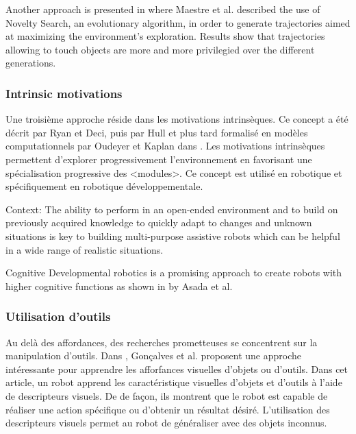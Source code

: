 \documentclass{llncs}
\begin{document}
Another approach is presented in \cite{Maestre2015} where Maestre et al. described the use of Novelty Search, an evolutionary algorithm, in order to generate trajectories aimed at maximizing the environment's exploration. Results show that trajectories allowing to touch objects are more and more privilegied over the different generations.

\subsubsection{Intrinsic motivations}
Une troisième approche réside dans les motivations intrinsèques. Ce concept a été décrit par Ryan et Deci, puis par Hull et plus tard formalisé en modèles computationnels par Oudeyer et Kaplan dans \cite{10.3389/neuro.12.006.2007}. Les motivations intrinsèques permettent d'explorer progressivement l'environnement en favorisant une spécialisation progressive des <modules>. Ce concept est utilisé en robotique et spécifiquement en robotique développementale.


Context: The ability to perform in an open-ended environment and to build on previously acquired knowledge to quickly adapt to changes and unknown situations is key to building
multi-purpose assistive robots which can be helpful in a wide range of realistic situations.

Cognitive Developmental robotics is a promising approach to create robots with higher cognitive functions as shown in \cite{Asada2009} by Asada et al.

\subsubsection{Utilisation d'outils}
Au delà des affordances, des recherches prometteuses se concentrent sur la manipulation d'outils. Dans \cite{Goncalves2014}, Gonçalves et al. proposent une approche intéressante pour apprendre les afforfances visuelles d'objets ou d'outils. Dans cet article, un robot apprend les caractéristique visuelles d'objets et d'outils à l'aide de descripteurs visuels. De de façon, ils montrent que le robot est capable de réaliser une action spécifique ou d'obtenir un résultat désiré. L'utilisation des descripteurs visuels permet au robot de généraliser avec des objets inconnus.
\end{document}
